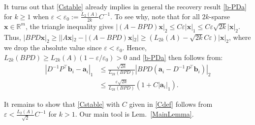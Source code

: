 \documentclass[journal, twocolumn]{IEEEtran}
\begin{document}
It turns out that \eqref{Cstable} already implies in general the recovery result \eqref{b-PDa} for $k \geq 1$ when $\varepsilon < \varepsilon_0 := \frac{L_2(A)}{2k}C^{-1}$. To see why, note that for all $2k$-sparse $\mathbf{x} \in \mathbb{R}^m$, the triangle inequality gives \mbox{$|(A-BPD)\mathbf{x}|_2  \leq C\varepsilon|\mathbf{x}|_1 \leq C \varepsilon \sqrt{2k}  |\mathbf{x}|_2$}. Thus, $|BPD\mathbf{x}|_2 \geq | |A\mathbf{x}|_2 - |(A-BPD)\mathbf{x}|_2 | \geq (L_{2k}(A) - \sqrt{2k}C\varepsilon ) |\mathbf{x}|_2$, where we drop the absolute value since $\varepsilon < \varepsilon_0$. Hence, $L_{2k}(BPD) \geq L_{2k}(A)\left( 1 - \varepsilon/\varepsilon_0 \right) > 0$ and \eqref{b-PDa} then follows from:
\begin{align*}
|D^{-1}P^{\top}\mathbf{b}_i - \mathbf{a}_i|_1
&\leq \frac{\sqrt{2k}}{L_{2k}(BPD)}|BPD(\mathbf{a}_i - D^{-1}P^{\top}\mathbf{b}_i)|_2 \\
&\leq \frac{\varepsilon\sqrt{2k}}{L_{2k}(BPD)}(1+C|\mathbf{a}_i|_1).
\end{align*}

It remains to show that \eqref{Cstable} with $C$ given in \eqref{Cdef} follows from $\varepsilon < \frac{L_2(A)}{\sqrt{2}}C^{-1}$ for $k > 1$. Our main tool is Lem.~\ref{MainLemma}.
\end{document}
